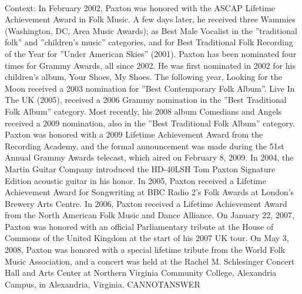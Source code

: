 \documentclass[11pt,a4paper, onecolumn]{article}
\begin{document}
\\ Context: In February 2002, Paxton was honored with the ASCAP Lifetime Achievement Award in Folk Music. A few days later, he received three Wammies (Washington, DC, Area Music Awards); as Best Male Vocalist in the ''traditional folk'' and ''children's music'' categories, and for Best Traditional Folk Recording of the Year for ''Under American Skies'' (2001). Paxton has been nominated four times for Grammy Awards, all since 2002. He was first nominated in 2002 for his children's album, Your Shoes, My Shoes. The following year, Looking for the Moon received a 2003 nomination for ''Best Contemporary Folk Album''. Live In The UK (2005), received a 2006 Grammy nomination in the ''Best Traditional Folk Album'' category. Most recently, his 2008 album Comedians and Angels received a 2009 nomination, also in the ''Best Traditional Folk Album'' category. Paxton was honored with a 2009 Lifetime Achievement Award from the Recording Academy, and the formal announcement was made during the 51st Annual Grammy Awards telecast, which aired on February 8, 2009. In 2004, the Martin Guitar Company introduced the HD-40LSH Tom Paxton Signature Edition acoustic guitar in his honor. In 2005, Paxton received a Lifetime Achievement Award for Songwriting at BBC Radio 2's Folk Awards at London's Brewery Arts Centre. In 2006, Paxton received a Lifetime Achievement Award from the North American Folk Music and Dance Alliance. On January 22, 2007, Paxton was honored with an official Parliamentary tribute at the House of Commons of the United Kingdom at the start of his 2007 UK tour. On May 3, 2008, Paxton was honored with a special lifetime tribute from the World Folk Music Association, and a concert was held at the Rachel M. Schlesinger Concert Hall and Arts Center at Northern Virginia Community College, Alexandria Campus, in Alexandria, Virginia. CANNOTANSWER
\end{document}
